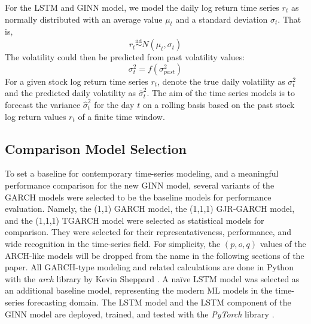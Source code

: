 For the LSTM and GINN model, we model the daily log return time series $r_t$ as normally distributed with an average value $\mu_t$ and a standard deviation $\sigma_t$. That is, 
\begin{equation}
  r_t \overset{\mathrm{iid}}{\sim} N(\mu _t, \sigma _t)
\end{equation}
The volatility could then be predicted from past volatility values: 
\begin{equation}
  \sigma_t^2 = f (\sigma_{past}^2)
\end{equation}
For a given stock log return time series $r_t$, denote the true daily volatility as $\sigma_t^2$ and the predicted daily volatility as $\hat{\sigma}_t^2$. The aim of the time series models is to forecast the variance $\hat{\sigma}_t^2$ for the day $t$ on a rolling basis based on the past stock log return values $r_t$ of a finite time window. 

\subsection{Comparison Model Selection}
To set a baseline for contemporary time-series modeling, and a meaningful performance comparison for the new GINN model, several variants of the GARCH models were selected to be the baseline models for performance evaluation. Namely, the (1,1) GARCH model, the (1,1,1) GJR-GARCH model, and the (1,1,1) TGARCH model were selected as statistical models for comparison. They were selected for their representativeness, performance, and wide recognition in the time-series field. For simplicity, the $(p,o,q)$ values of the ARCH-like models will be dropped from the name in the following sections of the paper. All GARCH-type modeling and related calculations are done in Python with the \textit{arch} library by Kevin Sheppard \cite{sheppard_bashtagearch_2023}. A naïve LSTM model was selected as an additional baseline model, representing the modern ML models in the time-series forecasting domain. The LSTM model and the LSTM component of the GINN model are deployed, trained, and tested with the \textit{PyTorch} library \cite{paszke_pytorch_2019}.


